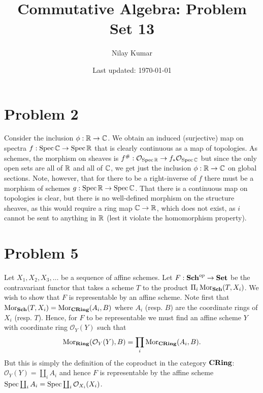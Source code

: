\documentclass{../../mathnotes}
\title{Commutative Algebra: Problem Set 13}
\author{Nilay Kumar}
\date{Last updated: \today}
\begin{document}
\maketitle

\section*{Problem 2}

Consider the inclusion $\phi:\mathbb{R}\to\mathbb{C}$. We obtain an induced (surjective) map on spectra $f:\operatorname{Spec}\mathbb{C}\to\operatorname{Spec}\mathbb{R}$ that is
clearly continuous as a map of topologies. As schemes, the morphism on sheaves is $f^\#:\mathcal{O}_{\operatorname{Spec} \mathbb{R}}\to f_*\mathcal{O}_{\operatorname{Spec} \mathbb{C}}$
but since the only open sets are all of $\mathbb{R}$ and all of $\mathbb{C}$, we get just the inclusion $\phi:\mathbb{R}\to\mathbb{C}$ on global sections.
Note, however, that for there to be a right-inverse of $f$ there must be a morphism of schemes $g:\operatorname{Spec}\mathbb{R}\to\operatorname{Spec}\mathbb{C}$. That
there is a continuous map on topologies is clear, but there is no well-defined morphism on the structure sheaves, as this would require
a ring map $\mathbb{C}\to\mathbb{R}$, which does not exist, as $i$ cannot be sent to anything in $\mathbb{R}$ (lest it violate the homomorphism property).

\section*{Problem 5}

Let $X_1,X_2,X_3,\ldots$ be a sequence of affine schemes. Let $F:{ \normalfont\textbf{Sch}}^{op}\to{ \normalfont\textbf{Set}}$ be the contravariant functor
that takes a scheme $T$ to the product $\Pi_i\operatorname{Mor}_{{ \normalfont\textbf{Sch}}}(T,X_i)$. We wish to show that $F$ is representable by an affine scheme. Note
first that $\operatorname{Mor}_{{ \normalfont\textbf{Sch}}}(T,X_i)=\operatorname{Mor}_{{ \normalfont\textbf{CRing}}}(A_i,B)$ where $A_i$ (resp. $B$) are the coordinate rings of $X_i$ (resp. $T$).
Hence, for $F$ to be representable we must find an affine scheme $Y$ with coordinate ring $\mathcal{O}_Y(Y)$ such that
\[ \operatorname{Mor}_{{ \normalfont\textbf{Ring}}}(\mathcal{O}_Y(Y),B)=\prod_i\operatorname{Mor}_{{ \normalfont\textbf{CRing}}}(A_i,B). \]
But this is simply the definition of the coproduct in the category ${ \normalfont\textbf{CRing}}$: $\mathcal{O}_Y(Y)=\coprod_iA_i$
and hence $F$ is representable by the affine scheme $\operatorname{Spec}\coprod_i A_i=\operatorname{Spec}\coprod_i\mathcal{O}_{X_i}(X_i)$.
\end{document}
